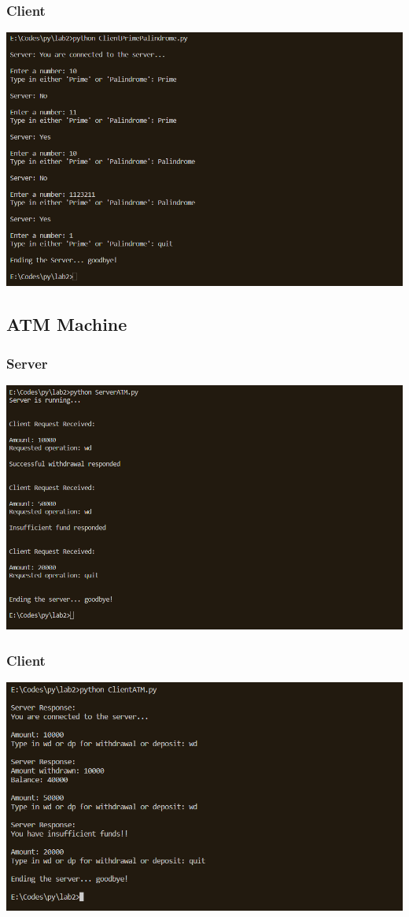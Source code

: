 \documentclass[11pt]{article}
\begin{document}
        \subsubsection{Client}
        \includegraphics[width=\textwidth]{Client Prime Palindrome.png}
    \subsection{ATM Machine}
        \subsubsection{Server}
        \includegraphics[width=\textwidth]{ServerATM.png}
        \subsubsection{Client}
        \includegraphics[width=\textwidth]{ClientATM.png}
\end{document}
